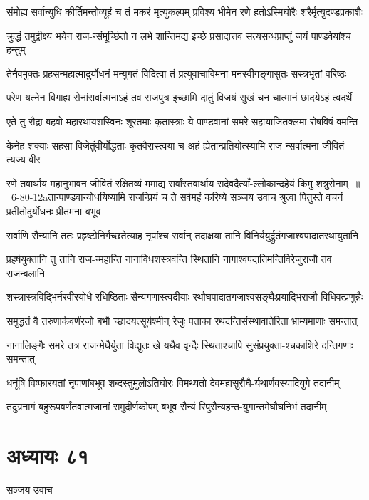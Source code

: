 \twolineshloka
{संमोह्य सर्वान्युधि कीर्तिमन्तोव्यूहं च तं मकरं मृत्युकल्पम्}
{प्रविश्य भीमेन रणे हतोऽस्मिघोरैः शरैर्मृत्युदण्डप्रकाशैः}


\twolineshloka
{क्रुद्धं तमुद्वीक्ष्य भयेन राज-न्संमूर्च्छितो न लभे शान्तिमद्य}
{इच्छे प्रसादात्तव सत्यसन्धप्राप्तुं जयं पाण्डवेयांश्च हन्तुम्}


\twolineshloka
{तेनैवमुक्तः प्रहसन्महात्मादुर्योधनं मन्युगतं विदित्वा}
{तं प्रत्युवाचाविमना मनस्वीगङ्गासुतः सस्त्रभृतां वरिष्ठः}


\twolineshloka
{परेण यत्नेन विगाह्य सेनांसर्वात्मनाऽहं तव राजपुत्र}
{इच्छामि दातुं विजयं सुखं चन चात्मानं छादयेऽहं त्वदर्थे}


\twolineshloka
{एते तु रौद्रा बहवो महारथायशस्विनः शूरतमाः कृतास्त्राः}
{ये पाण्डवानां समरे सहायाजितक्लमा रोषविषं वमन्ति}


\twolineshloka
{केनेह शक्याः सहसा विजेतुंवीर्योद्धताः कृतवैरास्त्वया च}
{अहं ह्येतान्प्रतियोत्स्यामि राज-न्सर्वात्मना जीवितं त्यज्य वीर}


\fourlineindentedshloka
{रणे तवार्थाय महानुभावन जीवितं रक्षितव्यं ममाद्य}
{सर्वांस्तवार्थाय सदेवदैत्याँ-ल्लोकान्दहेयं किमु शत्रुसेनाम् ॥ 6-80-12aतान्पाण्डवान्योधयिष्यामि राजन्प्रियं च ते सर्वमहं करिष्ये}
{सञ्जय उवाच}
{श्रुत्वा पितुस्ते वचनं प्रतीतोदुर्योधनः प्रीतमना बभूव}


\twolineshloka
{सर्वाणि सैन्यानि ततः प्रहृष्टोनिर्गच्छतेत्याह नृपांश्च सर्वान्}
{तदाक्षया तानि विनिर्ययुर्द्रुतंगजाश्वपादातरथायुतानि}


\twolineshloka
{प्रहर्षयुक्तानि तु तानि राज-न्महान्ति नानाविधशस्त्रवन्ति}
{स्थितानि नागाश्वपदातिमन्तिविरेजुराजौ तव राजन्बलानि}


\twolineshloka
{शस्त्रास्त्रविद्भिर्नरवीरयोधै-रधिष्ठिताः सैन्यगणास्त्वदीयाः}
{रथौघपादातगजाश्वसङ्घैःप्रयाद्भिराजौ विधिवत्प्रणुन्नैः}


\twolineshloka
{समुद्धतं वै तरुणार्कवर्णंरजो बभौ च्छादयत्सूर्यश्मीन्}
{रेजुः पताका रथदन्तिसंस्थावातेरिता भ्राम्यमाणाः समन्तात्}


\twolineshloka
{नानालिङ्गैः समरे तत्र राजन्मेघैर्युता विद्युतः खे यथैव}
{वृन्दैः स्थिताश्चापि सुसंप्रयुक्ता-श्चकाशिरे दन्तिगणाः समन्तात्}


\twolineshloka
{धनूंषि विष्फारयतां नृपाणांबभूव शब्दस्तुमुलोऽतिघोरः}
{विमथ्यतो देवमहासुरौघै-र्यथार्णवस्यादियुगे तदानीम्}


\twolineshloka
{तदुग्रनागं बहुरूपवर्णंतवात्मजानां समुदीर्णकोपम्}
{बभूव सैन्यं रिपुसैन्यहन्त-युगान्तमेघौघनिभं तदानीम्}


\chapter{अध्यायः ८१}
\twolineshloka
{सञ्जय उवाच}
{}


